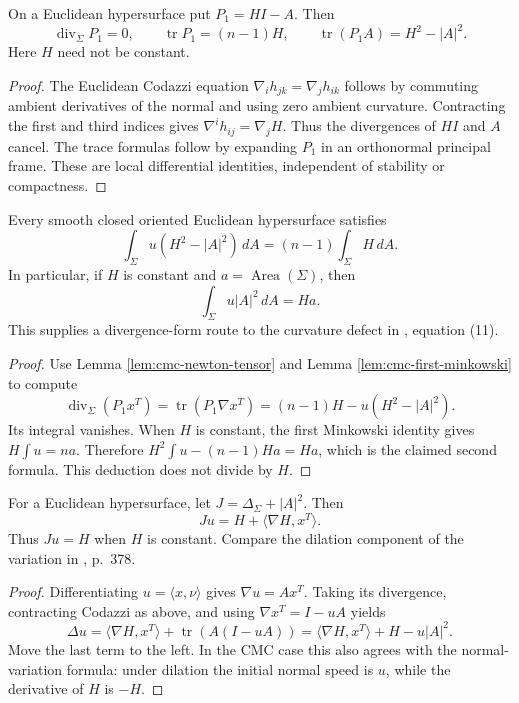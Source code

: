 \begin{lemma}\label{lem:cmc-newton-tensor}
On a Euclidean hypersurface put $P_1=HI-A$. Then
\[
 \operatorname{div}_\Sigma P_1=0,\qquad
 \operatorname{tr}P_1=(n-1)H,\qquad
 \operatorname{tr}(P_1A)=H^2-|A|^2.
\]
Here $H$ need not be constant.
\end{lemma}
\begin{proof}
The Euclidean Codazzi equation $\nabla_i h_{jk}=\nabla_j h_{ik}$ follows by commuting ambient derivatives of the normal and using zero ambient curvature. Contracting the first and third indices gives $\nabla^i h_{ij}=\nabla_jH$. Thus the divergences of $HI$ and $A$ cancel. The trace formulas follow by expanding $P_1$ in an orthonormal principal frame. These are local differential identities, independent of stability or compactness.
\end{proof}

\begin{proposition}\label{prop:cmc-second-minkowski}
Every smooth closed oriented Euclidean hypersurface satisfies
\[
 \int_\Sigma u(H^2-|A|^2)\,dA=(n-1)\int_\Sigma H\,dA.
\]
In particular, if $H$ is constant and $a=\operatorname{Area}(\Sigma)$, then
\[
 \int_\Sigma u|A|^2\,dA=Ha.
\]
This supplies a divergence-form route to the curvature defect in \cite{Wen91}, equation (11).
\end{proposition}
\begin{proof}
Use Lemma \ref{lem:cmc-newton-tensor} and Lemma \ref{lem:cmc-first-minkowski} to compute
\[
 \operatorname{div}_\Sigma(P_1x^T)
 =\operatorname{tr}(P_1\nabla x^T)
 =(n-1)H-u(H^2-|A|^2).
\]
Its integral vanishes. When $H$ is constant, the first Minkowski identity gives $H\int u=na$. Therefore $H^2\int u-(n-1)Ha=Ha$, which is the claimed second formula. This deduction does not divide by $H$.
\end{proof}

\begin{proposition}\label{prop:cmc-support-jacobi}
For a Euclidean hypersurface, let $J=\Delta_\Sigma+|A|^2$. Then
\[
 Ju=H+\langle\nabla H,x^T\rangle.
\]
Thus $Ju=H$ when $H$ is constant. Compare the dilation component of the variation in \cite{Wen91}, p.~378.
\end{proposition}
\begin{proof}
Differentiating $u=\langle x,\nu\rangle$ gives $\nabla u=Ax^T$. Taking its divergence, contracting Codazzi as above, and using $\nabla x^T=I-uA$ yields
\[
 \Delta u=\langle\nabla H,x^T\rangle+\operatorname{tr}(A(I-uA))
 =\langle\nabla H,x^T\rangle+H-u|A|^2.
\]
Move the last term to the left. In the CMC case this also agrees with the normal-variation formula: under dilation the initial normal speed is $u$, while the derivative of $H$ is $-H$.
\end{proof}

